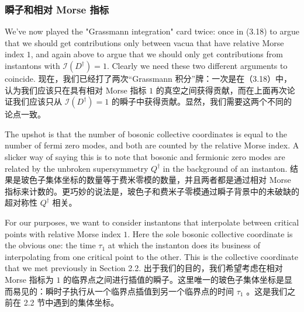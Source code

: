 \documentclass{ctexart}
\begin{document}
\begin{paracol}{2}
\subsubsection*{瞬子和相对 Morse 指标}
\switchcolumn*

We've now played the "Grassmann integration" card twice: once in (3.18) to argue that we should get contributions only between vacua that have relative Morse index $1$, and again above to argue that we should only get contributions from instantons with $\mathcal{I}(D^{\dagger}) = 1$. Clearly we need these two different arguments to coincide.
\switchcolumn
现在，我们已经打了两次“Grassmann 积分”牌：一次是在（3.18）中，认为我们应该只在具有相对 Morse 指标 $1$ 的真空之间获得贡献，而在上面再次论证我们应该只从 $\mathcal{I}(D^{\dagger}) = 1$ 的瞬子中获得贡献。显然，我们需要这两个不同的论点一致。
\switchcolumn*

The upshot is that the number of bosonic collective coordinates is equal to the number of fermi zero modes, and both are counted by the relative Morse index. A slicker way of saying this is to note that bosonic and fermionic zero modes are related by the unbroken supersymmetry $Q^{\dagger}$ in the background of an instanton.
\switchcolumn
结果是玻色子集体坐标的数量等于费米零模的数量，并且两者都是通过相对 Morse 指标来计数的。更巧妙的说法是，玻色子和费米子零模通过瞬子背景中的未破缺的超对称性 $Q^{\dagger}$ 相关。
\switchcolumn*

For our purposes, we want to consider instantons that interpolate between critical points with relative Morse index $1$. Here the sole bosonic collective coordinate is the obvious one: the time $\tau_1$ at which the instanton does its business of interpolating from one critical point to the other. This is the collective coordinate that we met previously in Section 2.2.
\switchcolumn
出于我们的目的，我们希望考虑在相对 Morse 指标为 $1$ 的临界点之间进行插值的瞬子。这里唯一的玻色子集体坐标是显而易见的：瞬时子执行从一个临界点插值到另一个临界点的时间 $\tau_1$ 。这是我们之前在 2.2 节中遇到的集体坐标。
\switchcolumn*


\end{paracol}
\end{document}
